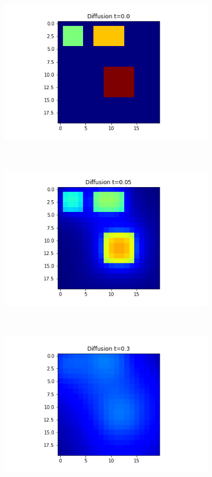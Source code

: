 \documentclass[10pt,a4paper]{article}
\begin{document}
\begin{figure}[!h]
\begin{subfigure}[b]{0.25\textwidth}
    		\caption{}
    		\label{laplacet5}
    	\end{subfigure} \\
    	\begin{subfigure}[b]{0.25\textwidth}
    		\includegraphics[width=\textwidth]{images/mellin-x3-t0.png}
    		\caption{}
    		\label{mellint0}
    	\end{subfigure}~
    	\begin{subfigure}[b]{0.25\textwidth}
    		\includegraphics[width= \textwidth]{images/mellin-x3-t05.png}
    		\caption{}
    		\label{mellint05}
    	\end{subfigure}~
    	\begin{subfigure}[b]{0.25\textwidth}
    		\includegraphics[width= \textwidth]{images/mellin-x3-t3.png}

\end{subfigure}
\end{figure}
\end{document}
